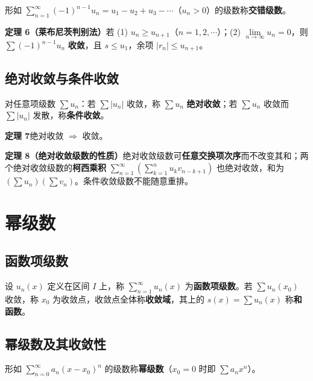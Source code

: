 形如 $\sum\limits_{n=1}^{\infty}(-1)^{n-1}u_n=u_1-u_2+u_3-\cdots$（$u_n>0$）的级数称\textbf{交错级数}。

\textbf{定理 6（莱布尼茨判别法）}\quad 若 (1) $u_n\ge u_{n+1}$（$n=1,2,\cdots$）；(2) $\lim\limits_{n\to\infty}u_n=0$，则 $\sum(-1)^{n-1}u_n$ \textbf{收敛}，且 $s\le u_1$，余项 $|r_n|\le u_{n+1}$。


\subsection{绝对收敛与条件收敛}

对任意项级数 $\sum u_n$：若 $\sum|u_n|$ 收敛，称 $\sum u_n$ \textbf{绝对收敛}；若 $\sum u_n$ 收敛而 $\sum|u_n|$ 发散，称\textbf{条件收敛}。

\textbf{定理 7}\quad 绝对收敛 $\Rightarrow$ 收敛。

\textbf{定理 8（绝对收敛级数的性质）}\quad 绝对收敛级数可\textbf{任意交换项次序}而不改变其和；两个绝对收敛级数的\textbf{柯西乘积} $\sum\limits_{n=1}^{\infty}\left(\sum\limits_{k=1}^{n}u_kv_{n-k+1}\right)$ 也绝对收敛，和为 $(\sum u_n)(\sum v_n)$。条件收敛级数不能随意重排。


\section{幂级数}
\subsection{函数项级数}

设 $u_n(x)$ 定义在区间 $I$ 上，称 $\sum\limits_{n=1}^{\infty}u_n(x)$ 为\textbf{函数项级数}。若 $\sum u_n(x_0)$ 收敛，称 $x_0$ 为收敛点，收敛点全体称\textbf{收敛域}，其上的 $s(x)=\sum u_n(x)$ 称\textbf{和函数}。

\subsection{幂级数及其收敛性}

形如 $\sum\limits_{n=0}^{\infty}a_n(x-x_0)^n$ 的级数称\textbf{幂级数}（$x_0=0$ 时即 $\sum a_nx^n$）。

